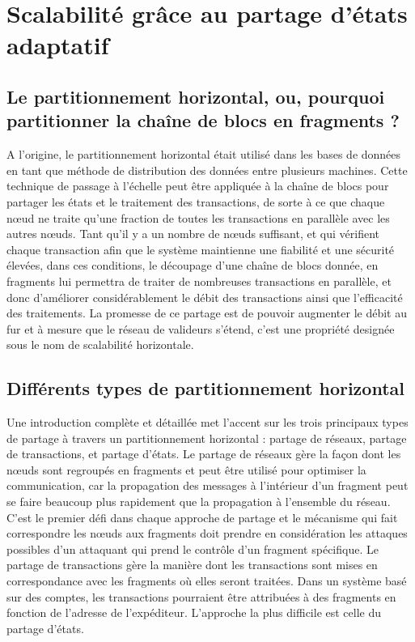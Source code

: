 \documentclass[journal]{IEEEtran}
\begin{document}

\section{Scalabilité grâce au partage d'états adaptatif}
\label{Scala}

\subsection{Le partitionnement horizontal, ou, pourquoi partitionner la chaîne de blocs en fragments ?}
A l’origine, le partitionnement horizontal était utilisé dans les bases de données en tant que méthode de distribution des données entre plusieurs machines. Cette technique de passage à l'échelle peut être appliquée à la chaîne  de blocs pour partager les états et le traitement des transactions, de sorte à ce que chaque nœud ne traite qu'une fraction de toutes les transactions en parallèle avec les autres nœuds. Tant qu'il y a un nombre de nœuds suffisant, et qui vérifient chaque transaction afin que le système maintienne une fiabilité et une sécurité élevées, dans ces conditions, le découpage d'une chaîne  de blocs donnée, en fragments lui permettra de traiter de nombreuses transactions en parallèle, et donc d'améliorer considérablement le débit des transactions ainsi que l’efficacité des traitements. La promesse de ce  partage est de pouvoir augmenter le débit au fur et à mesure que le réseau de valideurs s'étend, c’est une propriété designée sous le nom de scalabilité horizontale.

\subsection{Différents types de partitionnement horizontal}
Une introduction complète et détaillée \cite{16} met l'accent sur les trois principaux types de partage à travers un partitionnement horizontal : partage de réseaux, partage de transactions, et partage d’états. Le partage de réseaux gère la façon dont les nœuds sont regroupés en fragments et peut être utilisé pour optimiser la communication, car la propagation des messages à l'intérieur d'un fragment peut se faire beaucoup plus rapidement que la propagation à l'ensemble du réseau. C'est le premier défi dans chaque approche de partage  et le mécanisme qui fait correspondre les nœuds aux fragments doit prendre en considération les attaques possibles d'un attaquant qui prend le contrôle d'un fragment spécifique. Le partage de transactions gère la manière dont les transactions sont mises en correspondance avec les fragments où elles seront traitées. Dans un système basé sur des comptes, les transactions pourraient être attribuées à des fragments en fonction de l'adresse de l'expéditeur. L'approche la plus difficile est celle du partage d’états. 
\end{document}

